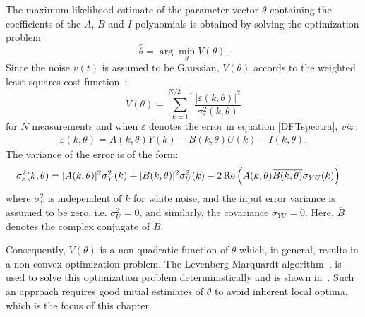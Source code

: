The maximum likelihood estimate of the parameter vector $\theta$  containing the coefficients of the $A$, $B$ and $I$  polynomials is obtained by solving the optimization problem
\begin{equation}
  \hat{\theta} = \arg\min_\theta V(\theta) \text{.}
\end{equation}
Since the noise $v(t)$ is assumed to be Gaussian, $V(\theta)$ accords to the weighted least squares cost function~\citep[Section 9.11]{Pintelon2012}:
\begin{equation}\label{eq:MLEcf}
V(\theta) = \sum_{k=1}^{N/2-1}\frac{|\varepsilon(k,\theta)|^2}{\sigma_\varepsilon^2(k,\theta)}
\end{equation}
for $N$ measurements and when $\varepsilon$ denotes the error in equation \eqref{DFTspectra},  \emph{viz}.:
\begin{align}
\varepsilon(k,\theta) = A(k,\theta)Y(k) - B(k,\theta)U(k) - I(k,\theta)\text{.}
\end{align}
The variance of the error is of the form:
\begin{equation}\label{eq:sigmaEps}
\begin{split}
\sigma_\varepsilon^2(k,\theta) 
  &=  |A(k,\theta)|^2\sigma_Y^2(k) 
   +  |B(k,\theta)|^2\sigma_U^2(k)
  - 2\operatorname{\mathrm{Re}} \left( A(k,\theta) \overline{B(k,\theta)} \sigma_{YU}(k) \right)
\end{split}
\end{equation}
where $\sigma_Y^2$ is independent of $k$ for white noise, and the input error variance is assumed to be zero, i.e. $\sigma^2_U=0$, and similarly, the covariance $\sigma_{YU} = 0$.
Here, $\overline{B}$ denotes the complex conjugate of $B$.

Consequently, $V(\theta)$ is a non-quadratic function of $\theta$ which, in general, results in a non-convex optimization problem. 
The Levenberg-Marquardt algorithm~\citep{Marquardt1963}, is used to solve this optimization problem deterministically and is shown in~.
Such an approach requires good initial estimates of $\theta$ to avoid inherent local optima, which is the focus of this chapter.

